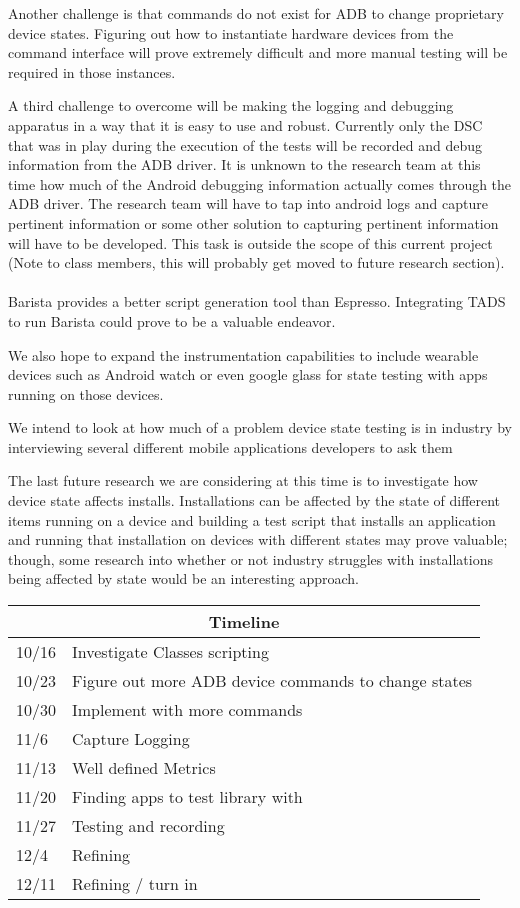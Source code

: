 Another challenge is that commands do not exist for ADB to change proprietary device states.  Figuring out how to instantiate hardware devices from the command interface will prove extremely difficult and more manual testing will be required in those instances.   

A third challenge to overcome will be making the logging and debugging apparatus in a way that it is easy to use and robust.  Currently only the DSC that was in play during the execution of the tests will be recorded and debug information from the ADB driver.  It is unknown to the research team at this time how much of the Android debugging information actually comes through the ADB driver.  The research team will have to tap into android logs and capture pertinent information or some other solution to capturing pertinent information will have to be developed.  This task is outside the scope of this current project (Note to class members, this will probably get moved to future research section).\\ \\

Barista \cite{7927971} provides a better script generation tool than Espresso.  Integrating TADS to run Barista could prove to be a valuable endeavor.  

We also hope to expand the instrumentation capabilities to include wearable devices such as Android watch or even google glass for state testing with apps running on those devices.

We intend to look at how much of a problem device state testing is in industry by interviewing several different mobile applications developers to ask them  

The last future research we are considering at this time is to investigate how device state affects installs.  Installations can be affected by the state of different items running on a device and building a test script that installs an application and running that installation on devices with different states may prove valuable; though, some research into whether or not industry struggles with installations being affected by state would be an interesting approach.  

\begin{tabular}{ |p{3cm}||p{3cm}| }
	\hline
	\multicolumn{2}{|c|}{Timeline} \\
	\hline
		10/16 & Investigate Classes scripting \\
		\hline
	10/23&   Figure out more ADB device commands to change states  \\
	\hline
	10/30 &Implement with more commands \\
	\hline
	11/6    &Capture Logging	 \\
	\hline
	11/13& Well defined Metrics \\
	\hline
	11/20& Finding apps to test library with  \\
	\hline
	11/27& Testing and recording \\
	\hline
	12/4 & Refining \\
	\hline
	12/11 & Refining / turn in \\
	\hline
	
\end{tabular}
\\
